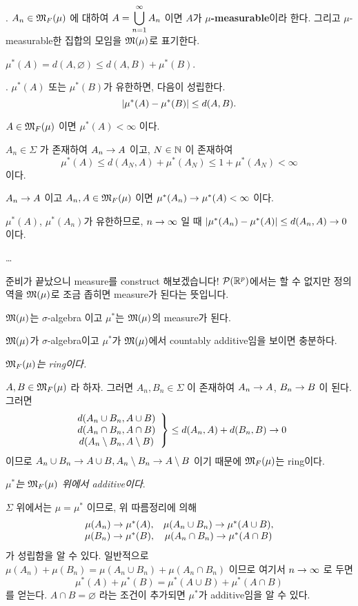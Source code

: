 .  \(A_n \in \mathfrak{M}_F(\mu)\) 에 대하여 \(A = \displaystyle \bigcup_{n=1}^\infty A_n\) 이면 \(A\)가 \textbf{\(\mu\)-measurable}이라 한다. 그리고 \(\mu\)-measurable한 집합의 모임을 \(\mathfrak{M}(\mu)\)로 표기한다.

\rmk \(\mu^\ast(A) = d(A, \varnothing) \leq d(A, B) + \mu^\ast(B)\).

\prop. \(\mu^\ast(A)\) 또는 \(\mu^\ast(B)\)가 유한하면, 다음이 성립한다.
\[
    \left| \mu^\ast(A) - \mu^\ast(B) \right| \leq d(A, B).
\]

\cor \(A \in \mathfrak{M}_F(\mu)\) 이면 \(\mu^\ast(A) < \infty\) 이다.

\pf \(A_n \in \Sigma\) 가 존재하여 \(A_n \rightarrow A\) 이고, \(N \in \mathbb{N}\) 이 존재하여
\[
    \mu^\ast(A) \leq d(A_N, A) + \mu^\ast(A_N) \leq 1 + \mu^\ast(A_N) < \infty
\]
이다.

\cor \(A_n \rightarrow A\) 이고 \(A_n, A \in \mathfrak{M}_F(\mu)\) 이면 \(\mu^\ast(A_n)\rightarrow \mu^\ast(A) < \infty\) 이다.

\pf \(\mu^\ast(A)\), \(\mu^\ast(A_n)\)가 유한하므로, \(n \rightarrow \infty\) 일 때 \(\left| \mu^\ast(A_n) - \mu^\ast(A) \right| \leq d(A_n, A) \rightarrow 0\) 이다.

\dots

준비가 끝났으니 measure를 construct 해보겠습니다! \(\mathcal{P}(\mathbb{R}^p)\)에서는 할 수 없지만 정의역을 \(\mathfrak{M}(\mu)\)로 조금 좁히면 measure가 된다는 뜻입니다.

 \(\mathfrak{M}(\mu)\)는 \(\sigma\)-algebra 이고 \(\mu^\ast\)는 \(\mathfrak{M}(\mu)\)의 measure가 된다.

\pf \(\mathfrak{M}(\mu)\)가 \(\sigma\)-algebra이고 \(\mu^\ast\)가 \(\mathfrak{M}(\mu)\)에서 countably additive임을 보이면 충분하다.

 \textit{\(\mathfrak{M}_F(\mu)\)는 ring이다.}

\(A, B \in \mathfrak{M}_F(\mu)\) 라 하자. 그러면 \(A_n, B_n \in \Sigma\) 이 존재하여 \(A_n \rightarrow A\), \(B_n \rightarrow B\) 이 된다. 그러면
\[
    \left.\begin{array}{c}d(A_n \cup B_n, A \cup B) \\ d(A_n \cap B_n, A \cap B) \\ d(A_n \setminus B_n, A \setminus B)\end{array}\right\}
    \leq d(A_n, A) + d(B_n, B) \rightarrow 0
\]
이므로 \(A_n \cup B_n \rightarrow A \cup B, A_n \setminus B_n \rightarrow A\setminus B\) 이기 때문에 \(\mathfrak{M}_F(\mu)\)는 ring이다.

 \textit{\(\mu^\ast\)는 \(\mathfrak{M}_F(\mu)\) 위에서 additive이다}.

\(\Sigma\) 위에서는 \(\mu = \mu^\ast\) 이므로, 위 따름정리에 의해
\[
    \begin{matrix}
        \mu(A_n) \rightarrow \mu^\ast(A), & \mu(A_n\cup B_n) \rightarrow \mu^\ast(A\cup B), \\
        \mu(B_n) \rightarrow \mu^\ast(B), & \mu(A_n\cap B_n) \rightarrow \mu^\ast(A\cap B)
    \end{matrix}
\]
가 성립함을 알 수 있다. 일반적으로 \(\mu(A_n) + \mu(B_n) = \mu(A_n \cup B_n) + \mu(A_n \cap B_n)\) 이므로 여기서 \(n \rightarrow \infty\) 로 두면
\[
    \mu^\ast(A) + \mu^\ast(B) = \mu^\ast(A\cup B) + \mu^\ast(A \cap B)
\]
를 얻는다. \(A \cap B = \varnothing\) 라는 조건이 추가되면 \(\mu^\ast\)가 additive임을 알 수 있다.

